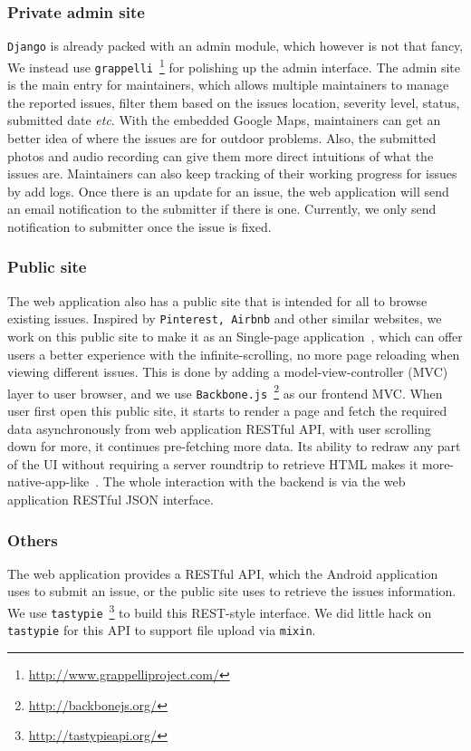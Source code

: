 \documentclass{acm_proc_article-sp}
\begin{document}
\subsubsection{Private admin site}
\texttt{Django} is already packed with an admin module, which however is not that fancy,
We instead use \texttt{grappelli}~\footnote{\url{http://www.grappelliproject.com/}} for polishing up the admin
interface. The admin site is the main entry for maintainers, which allows multiple maintainers to manage the reported issues, 
filter them based on the issues location, severity level, status, submitted date \textit{etc}.
With the embedded Google Maps, maintainers can get an better idea of where the issues are for outdoor problems.
Also, the submitted photos and audio recording can give them more direct intuitions of what the issues are.
Maintainers can also keep tracking of their working progress for issues by add logs. Once there is an update for an issue, the web application
will send an email notification to the submitter if there is one. Currently, we only send notification to submitter once the issue is fixed.
 
\subsubsection{Public site}
The web application also has a public site that is intended for all to browse existing issues.
Inspired by \texttt{Pinterest, Airbnb} and other similar websites, we work on this public site to make it as an Single-page application~\cite{wiki-spa}, 
which can offer users a better experience with the infinite-scrolling, no more page reloading when viewing different issues. 
This is done by adding a model-view-controller (MVC) layer to user browser, and we use \texttt{Backbone.js}~\footnote{\url{http://backbonejs.org/}} 
as our frontend MVC. When user first open this public site, it starts to render a page and fetch the required data asynchronously from web application RESTful
API, with user scrolling down for more, it continues pre-fetching more data. Its ability to redraw any part of the UI without requiring a server roundtrip to retrieve
HTML makes it more-native-app-like~\cite{spa-book}.
The whole interaction with the backend is via the web application RESTful JSON interface. 

\subsubsection{Others}
The web application provides a RESTful API, which the Android application uses to submit an issue, or the public site uses to retrieve the issues
information. We use \texttt{tastypie}~\footnote{\url{http://tastypieapi.org/}} to build this REST-style interface. We did little hack on \texttt{tastypie}
for this API to support file upload via \texttt{mixin}.
\end{document}
